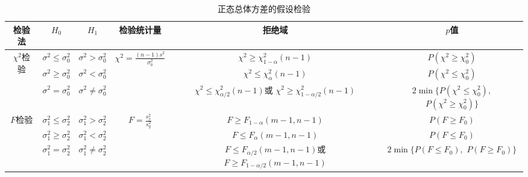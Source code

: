 \begin{table}[H]
    \caption{正态总体方差的假设检验}
    \centering
    \begin{tabular}{cccccc}
        \toprule[1.5pt]
        检验法                         & $H_0$                        & $H_1$                        & 检验统计量                                                   & 拒绝域                                              & $p$值                      \\
        \midrule[1pt]
        \multirow{3}{*}{$\chi^2$检验} & $\sigma^2 \leq \sigma_0^2$   & $\sigma^2 > \sigma_0^2$      & \multirow{3}{*}{$\chi^2=\frac{(n - 1)s^2}{\sigma_0^2}$} & $\chi^2 \geq \chi_{1-\alpha}^2(n-1)$             & $P(\chi^2 \geq \chi_0^2)$ \\

                                    & $\sigma^2 \geq \sigma_0^2$   & $\sigma^2 < \sigma_0^2$      &                                                         & $\chi^2 \leq \chi_{\alpha}^2(n-1)$               & $P(\chi^2 \leq \chi^2_0)$ \\

                                    & $\sigma^2 = \sigma_0^2$      & $\sigma^2 \neq \sigma_0^2$   &                                                         & \makecell{$\chi^2 \leq \chi_{\alpha /2}^2(n-1)$或                             \\$\chi^2 \geq \chi_{1-\alpha /2}^2(n-1) $} &\makecell{$2\min\{P(\chi^{2}\leq \chi_{0}^{2}),$\\$P(\chi^{2}\geq \chi_{0}^{2})\}$}\\
        \midrule
        \multirow{3}{*}{$F$检验}      & $\sigma_1^2 \leq \sigma_2^2$ & $\sigma_1^2 > \sigma_2^2$    & \multirow{3}{*}{$F=\frac{s_x^2}{s_y^2}$}                & $F \geq F_{1-\alpha}(m-1,n-1)$                   & $P(F \geq F_0)$           \\

                                    & $\sigma_1^2 \geq \sigma_2^2$ & $\sigma_1^2 < \sigma_2^2$    &                                                         & $F \leq F_{\alpha}(m-1,n-1)$                     & $P(F \leq F_0)$           \\

                                    & $\sigma_1^2 = \sigma_2^2$    & $\sigma_1^2 \neq \sigma_2^2$ &                                                         & \makecell{$F\leq F_{\alpha/2}(m-1,n-1)$或                                     \\$F \geq F_{1-\alpha/2}(m-1,n-1)$} &\makecell{$2\min\{P(F\leq F_0),$\\ $P(F \geq F_0)\}$} \\
        \bottomrule
    \end{tabular}
\end{table}
